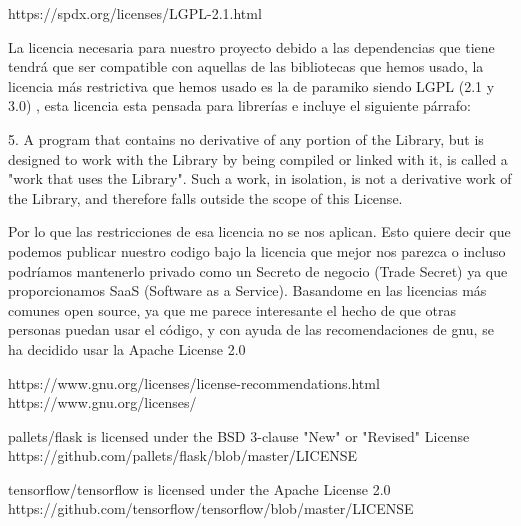 https://spdx.org/licenses/LGPL-2.1.html

La licencia necesaria para nuestro proyecto debido a las dependencias que tiene tendrá que ser compatible con aquellas de las bibliotecas que hemos usado, la licencia más restrictiva que hemos usado es la de paramiko siendo LGPL (2.1 y 3.0) , esta licencia esta pensada para librerías e incluye el siguiente párrafo:

5. A program that contains no derivative of any portion of the Library, but is designed to work with the Library by being compiled or linked with it, is called a "work that uses the Library". Such a work, in isolation, is not a derivative work of the Library, and therefore falls outside the scope of this License. 

Por lo que las restricciones de esa licencia no se nos aplican. Esto quiere decir que podemos publicar nuestro codigo bajo la licencia que mejor nos parezca o incluso podríamos mantenerlo privado como un Secreto de negocio (Trade Secret) ya que proporcionamos SaaS (Software as a Service). Basandome en las licencias más comunes open source, ya que me parece interesante el hecho de que otras personas puedan usar el código, y con ayuda de las recomendaciones de gnu, se ha decidido usar la Apache License 2.0


https://www.gnu.org/licenses/license-recommendations.html
https://www.gnu.org/licenses/


pallets/flask is licensed under the
BSD 3-clause "New" or "Revised" License
https://github.com/pallets/flask/blob/master/LICENSE

 tensorflow/tensorflow is licensed under the
Apache License 2.0
https://github.com/tensorflow/tensorflow/blob/master/LICENSE

